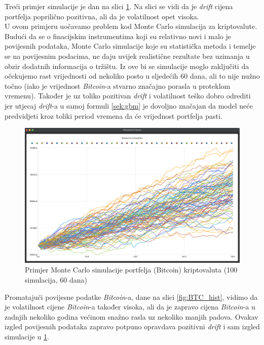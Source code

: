 \documentclass[zavrsnirad]{fer}
\begin{document}
Treći primjer simulacije je dan na slici \ref{fig:monte_carlo_example3}.
Na slici se vidi da je \textit{drift} cijena portfelja poprilično
pozitivna, ali da je volatilnost opet visoka.\\
U ovom primjeru uočavamo problem kod Monte Carlo simulacija za
kriptovalute. Budući da se o finacijskim instrumentima koji su
relativno novi i malo je povijesnih podataka,
Monte Carlo simulacije koje su statistička metoda i temelje se
na povijesnim podacima, ne daju uvijek
realistične rezultate bez uzimanja u obzir dodatnih informacija o tržištu.
Iz ove bi se simulacije moglo zaključiti da očekujemo rast vrijednosti
od nekoliko posto u sljedećih 60 dana, ali to nije nužno točno
(iako je vrijednost \textit{Bitcoin}-a stvarno značajno porasla u proteklom vremenu).
Također je uz toliko pozitivan \textit{drift} i volatilnost teško
dobro odrediti jer utjecaj \textit{drift}-a u samoj formuli
\ref{sek:gbm} je dovoljno značajan da model neće predvidjeti kroz
toliki period vremena da će vrijednost portfelja pasti.
\begin{figure}[H]
    \centering
    \includegraphics[width=1.0\textwidth]{Figures/monte_carlo_example3.png}
    \caption{Primjer Monte Carlo simulacije portfelja (Bitcoin) kriptovaluta (100
    simulacija, 60 dana)}
    \label{fig:monte_carlo_example3}
\end{figure}
Promatajući povijesne podatke \textit{Bitcoin}-a, dane na slici \ref{fig:BTC_hist},
vidimo da je volatilnost cijene \textit{Bitcoin}-a također visoka, ali da je
zapravo cijena \textit{Bitcoin}-a u zadnjih nekoliko godina većinom snažno
rasla uz nekoliko manjih padova. Ovakav izgled povijesnih podataka
zapravo potpuno opravdava pozitivni \textit{drift} i sam izgled
simulacije u \ref{fig:monte_carlo_example3}.
\end{document}
